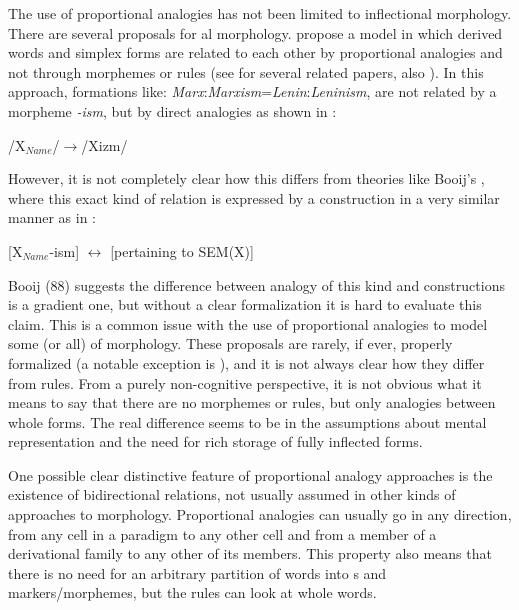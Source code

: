 The use of proportional analogies has not been limited to inflectional morphology. There are several proposals for al morphology. \textcite{Singh.2003a} propose a model in which derived words and simplex forms are related to each other by proportional analogies and not through morphemes or rules (see \citealt{Singh.2003} for several related papers, also \citealt{Neuvel.2001}). In this approach, formations like: \textit{Marx}:\textit{Marxism}=\-\textit{Lenin}:\textit{Leninism}, are not related by a morpheme \textit{-ism}, but by direct analogies as shown in :

\begin{exe}
    \ex \label{analogy-derivation-ism} /X$_{Name}$/$\rightarrow$/Xizm/
\end{exe}

However, it is not completely clear how this differs from theories like Booij's  \autocite{Booij.2010}, where this exact kind of relation is expressed by a construction in a very similar manner as in :

\begin{exe}
    \ex \label{analogy-derivation-ism-cxt} [X$_{Name}$-ism] $\leftrightarrow$ [pertaining to SEM(X)]
\end{exe}

\largerpage
Booij (88) suggests the difference between analogy of this kind and constructions is a gradient one, but without a clear formalization it is hard to evaluate this claim. This is a common issue with the use of proportional analogies to model some (or all) of morphology. These proposals are rarely, if ever, properly formalized (a notable exception is \citealt{Beniamine.2017}), and it is not always clear how they differ from rules. From a purely non-cognitive perspective, it is not obvious what it means to say that there are no morphemes or rules, but only analogies between whole forms. The real difference seems to be in the assumptions about mental representation and the need for rich storage of fully inflected forms.

One possible clear distinctive feature of proportional analogy approaches is the existence of bidirectional relations, not usually assumed in other kinds of approaches to morphology. Proportional analogies can usually go in any direction, from any cell in a paradigm to any other cell and from a member of a derivational family to any other of its members. This property also means that there is no need for an arbitrary partition of words into s and markers/morphemes, but the rules can look at whole words.


